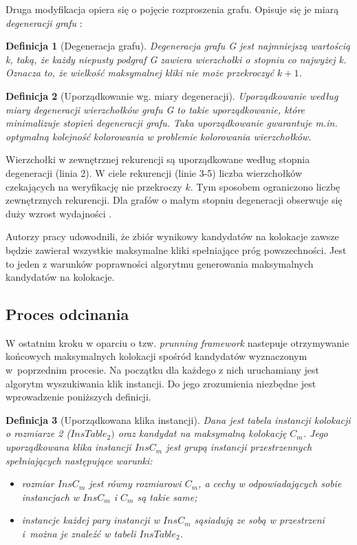 \documentclass[12pt]{article}
\newtheorem{defin}{Definicja}
\begin{document}
Druga modyfikacja opiera się o pojęcie rozproszenia grafu. Opisuje się je miarą \textit{degeneracji grafu} \cite{matusiak}:
\begin{defin}[Degeneracja grafu]
Degeneracja grafu G jest najmniejszą wartością k, taką, że każdy niepusty podgraf G zawiera wierzchołki o stopniu co najwyżej k. Oznacza to, że wielkość maksymalnej kliki nie może przekroczyć $k + 1$.
\label{def:degeneracy}
\end{defin}

\begin{defin}[Uporządkowanie wg. miary degeneracji]
Uporządkowanie według miary degeneracji wierzchołków grafu G to takie uporządkowanie, które minimalizuje stopień degeneracji grafu. Taka uporządkowanie gwarantuje m.in. optymalną kolejność kolorowania w problemie kolorowania wierzchołków.
\end{defin}

Wierzchołki w zewnętrznej rekurencji są uporządkowane według stopnia degeneracji (linia 2). W ciele rekurencji (linie 3-5) liczba wierzchołków czekających na weryfikację nie przekroczy $ k $. Tym sposobem ograniczono liczbę zewnętrznych rekurencji. Dla grafów o małym stopniu degeneracji obserwuje się duży wzrost wydajności \cite{degenerat}.

Autorzy pracy \cite{wang} udowodnili, że zbiór wynikowy kandydatów na kolokacje zawsze będzie zawierał wszystkie maksymalne kliki spełniające próg powszechności. Jest to jeden z warunków poprawności algorytmu generowania maksymalnych kandydatów na kolokacje.

\subsection{Proces odcinania}

W ostatnim kroku w oparciu o tzw. \textit{prunning framework} \cite{wang} nastepuje otrzymywanie końcowych maksymalnych kolokacji spośród kandydatów wyznaczonym w~poprzednim procesie. Na początku dla każdego z nich uruchamiany jest algorytm wyszukiwania klik instancji. Do jego zrozumienia niezbędne jest wprowadzenie poniższych definicji.

\begin{defin}[Uporządkowana klika instancji]
Dana jest tabela instancji kolokacji o rozmiarze 2 ($ InsTable_{2}) $ oraz kandydat na maksymalną kolokację $ C_{m} $. Jego uporządkowana klika instancji $ InsC_{m} $ jest grupą instancji przestrzennych spełniających następujące warunki:
\begin{itemize}
\item rozmiar $ InsC_{m} $ jest równy rozmiarowi $ C_{m} $, a cechy w odpowiadających sobie instancjach w $ InsC_{m} $ i $ C_{m} $ są takie same; %
\item instancje każdej pary instancji w $ InsC_{m} $ sąsiadują ze sobą w przestrzeni i~można je znaleźć w tabeli  $ InsTable_{2} $.
\end{itemize}
\end{defin}
\end{document}
